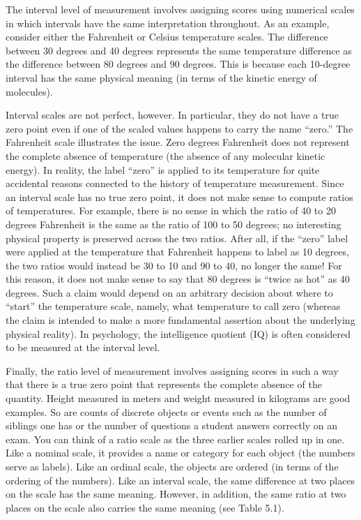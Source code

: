 \documentclass[]{book}
\theoremstyle{definition}
\theoremstyle{definition}
\theoremstyle{remark}
\begin{document}
The interval level of measurement involves assigning scores using
numerical scales in which intervals have the same interpretation
throughout. As an example, consider either the Fahrenheit or Celsius
temperature scales. The difference between 30 degrees and 40 degrees
represents the same temperature difference as the difference between 80
degrees and 90 degrees. This is because each 10-degree interval has the
same physical meaning (in terms of the kinetic energy of molecules).

Interval scales are not perfect, however. In particular, they do not
have a true zero point even if one of the scaled values happens to carry
the name ``zero.'' The Fahrenheit scale illustrates the issue. Zero
degrees Fahrenheit does not represent the complete absence of
temperature (the absence of any molecular kinetic energy). In reality,
the label ``zero'' is applied to its temperature for quite accidental
reasons connected to the history of temperature measurement. Since an
interval scale has no true zero point, it does not make sense to compute
ratios of temperatures. For example, there is no sense in which the
ratio of 40 to 20 degrees Fahrenheit is the same as the ratio of 100 to
50 degrees; no interesting physical property is preserved across the two
ratios. After all, if the ``zero'' label were applied at the temperature
that Fahrenheit happens to label as 10 degrees, the two ratios would
instead be 30 to 10 and 90 to 40, no longer the same! For this reason,
it does not make sense to say that 80 degrees is ``twice as hot'' as 40
degrees. Such a claim would depend on an arbitrary decision about where
to ``start'' the temperature scale, namely, what temperature to call
zero (whereas the claim is intended to make a more fundamental assertion
about the underlying physical reality). In psychology, the intelligence
quotient (IQ) is often considered to be measured at the interval level.

Finally, the ratio level of measurement involves assigning scores in
such a way that there is a true zero point that represents the complete
absence of the quantity. Height measured in meters and weight measured
in kilograms are good examples. So are counts of discrete objects or
events such as the number of siblings one has or the number of questions
a student answers correctly on an exam. You can think of a ratio scale
as the three earlier scales rolled up in one. Like a nominal scale, it
provides a name or category for each object (the numbers serve as
labels). Like an ordinal scale, the objects are ordered (in terms of the
ordering of the numbers). Like an interval scale, the same difference at
two places on the scale has the same meaning. However, in addition, the
same ratio at two places on the scale also carries the same meaning (see
Table 5.1).
\end{document}
